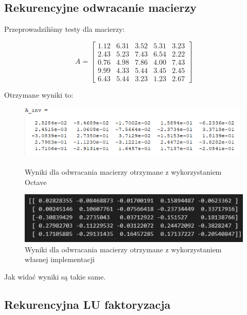 \documentclass{article}
\begin{document}
\subsection{Rekurencyjne odwracanie macierzy}

Przeprowadziliśmy testy dla macierzy:

\[
A = \begin{bmatrix}
1.12 & 6.31 & 3.52 & 5.31 & 3.23 \\
2.43 & 5.23 & 7.43 & 6.54 & 2.22 \\
0.76 & 4.98 & 7.86 & 4.00 & 7.43 \\
9.99 & 4.33 & 5.44 & 3.45 & 2.45 \\
6.43 & 5.44 & 3.23 & 1.23 & 2.67
\end{bmatrix}
\]

\noindent
Otrzymane wyniki to:

\begin{figure}[H]
  \begin{minipage}[b]{0.49\textwidth}
    \includegraphics[width=\textwidth]{images/octave_comparison_inversion_octave.png}
    \caption{Wyniki dla odwracania macierzy otrzymane z wykorzystaniem Octave}
  \end{minipage}
  \hfill
  \begin{minipage}[b]{0.49\textwidth}
    \includegraphics[width=\textwidth]{images/octave_comparison_inversion_own.png}
    \caption{Wyniki dla odwracania macierzy otrzymane z wykorzystaniem własnej implementacji}
  \end{minipage}
\end{figure}

\bigbreak

\noindent
Jak widać wyniki są takie same.

\subsection{Rekurencyjna LU faktoryzacja}
\end{document}
